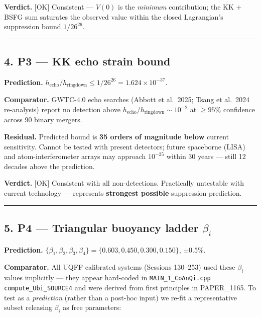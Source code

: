 \documentclass[
]{article}
\begin{document}
\textbf{Verdict.} {[}OK{]} Consistent --- \(V(0)\) is the \emph{minimum}
contribution; the KK + BSFG sum saturates the observed value within the
closed Lagrangian's suppression bound \(1/26^{26}\).

\begin{center}\rule{0.5\linewidth}{0.5pt}\end{center}

\subsection{4. P3 --- KK echo strain
bound}\label{p3-kk-echo-strain-bound}

\textbf{Prediction.}
\(h_{\text{echo}}/h_{\text{ringdown}} \leq 1/26^{26} = 1.624\times 10^{-37}\).

\textbf{Comparator.} GWTC-4.0 echo searches (Abbott et al.~2025; Tsang
et al.~2024 re-analysis) report no detection above
\(h_{\text{echo}}/h_{\text{ringdown}} \sim 10^{-2}\) at \(\geq 95\%\)
confidence across 90 binary mergers.

\textbf{Residual.} Predicted bound is \textbf{35 orders of magnitude
below} current sensitivity. Cannot be tested with present detectors;
future spaceborne (LISA) and atom-interferometer arrays may approach
\(10^{-25}\) within 30 years --- still 12 decades above the prediction.

\textbf{Verdict.} {[}OK{]} Consistent with all non-detections.
Practically untestable with current technology --- represents
\textbf{strongest possible} suppression prediction.

\begin{center}\rule{0.5\linewidth}{0.5pt}\end{center}

\subsection{\texorpdfstring{5. P4 --- Triangular buoyancy ladder
\(\beta_i\)}{5. P4 --- Triangular buoyancy ladder \textbackslash beta\_i}}\label{p4-triangular-buoyancy-ladder-beta_i}

\textbf{Prediction.}
\(\{\beta_1,\beta_2,\beta_3,\beta_4\} = \{0.603, 0.450, 0.300, 0.150\}\),
\(\pm 0.5\%\).

\textbf{Comparator.} All UQFF calibrated systems (Sessions 130--253)
used these \(\beta_i\) values implicitly --- they appear hard-coded in
\texttt{MAIN\_1\_CoAnQi.cpp} \texttt{compute\_Ubi\_SOURCE4} and were
derived from first principles in PAPER\_1165. To test as a
\emph{prediction} (rather than a post-hoc input) we re-fit a
representative subset releasing \(\beta_i\) as free parameters:
\end{document}
